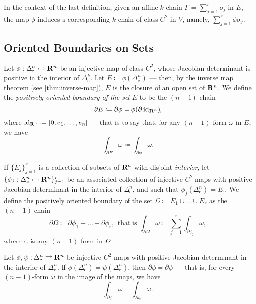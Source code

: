 In the context of the last definition, given an affine \(k\)-chain \(\Gamma
\coloneq \sum_{j=1}^r \sigma_j\) in \(E\), the map \(\phi\) induces a
corresponding \(k\)-chain of class \(C^2\) in \(V\), namely, \(\sum_{j=1}^r \phi
\sigma_j\).

\subsection{Oriented Boundaries on Sets}

\begin{definition}
\label{def:positively-oriented-boundary-on-sets}
Let \(\phi: \Delta_{\text{c}}^n \rightarrowtail \mathbf{R}^n\) be an injective map of class
\(C^2\), whose Jacobian determinant is positive in the interior of
\(\Delta_{\text{c}}^k\). Let \(E \coloneq \phi(\Delta_{\text{c}}^n)\) --- then,
by the inverse map theorem (see \cref{thm:inverse-map}), \(E\) is the closure of
an open set of \(\mathbf{R}^n\). We define the \emph{positively oriented boundary of
  the set} \(E\) to be the \((n-1)\)-chain
\[
  \partial E \coloneq \partial \phi = \phi(\partial \operatorname{id}_{\mathbf{R}^n}),
\]
where \(\operatorname{id}_{\mathbf{R}^n} \coloneq [0, e_1, \dots, e_n]\) --- that is to say that, for
any \((n-1)\)-form \(\omega\) in \(E\), we have
\[
  \int_{\partial E} \omega \coloneq \int_{\partial \phi} \omega.
\]

If \(\{E_{j}\}_{j=1}^r\) is a collection of subsets of \(\mathbf{R}^n\) with disjoint
\emph{interior}, let \(\{\phi_{j}: \Delta_{\text{c}}^n \rightarrowtail \mathbf{R}^n\}_{j=1}^r\) be
an associated collection of injective \(C^2\)-maps with positive Jacobian
determinant in the interior of \(\Delta_{\text{c}}^n\), and such that
\(\phi_j(\Delta_{\text{c}}^n) = E_j\). We define the positively oriented
boundary of the set \(\Omega \coloneq E_1 \cup \dots \cup E_r\) as the
\((n-1)\)-chain
\[
  \partial \Omega \coloneq \partial \phi_1 + \dots + \partial \phi_{r}
  \text{,}\ \text{ that is }
  \int_{\partial \Omega} \omega \coloneq \sum_{j=1}^r \int_{\partial \phi_j} \omega,
\]
where \(\omega\) is any \((n-1)\)-form in \(\Omega\).
\end{definition}

\begin{proposition}
\label{prop:same-boundary-same-integral-over-form}
Let \(\phi, \psi: \Delta_{\text{c}}^n \rightrightarrows \mathbf{R}^n\) be injective
\(C^2\)-maps with positive Jacobian determinant in the interior of
\(\Delta_{\text{c}}^n\). If \(\phi(\Delta_{\text{c}}^n) =
\psi(\Delta_{\text{c}}^n)\), then \(\partial \phi = \partial \psi\) --- that is,
for every \((n-1)\)-form \(\omega\) in the image of the maps, we have
\[
  \int_{\partial \phi} \omega = \int_{\partial \psi} \omega.
\]
\end{proposition}

